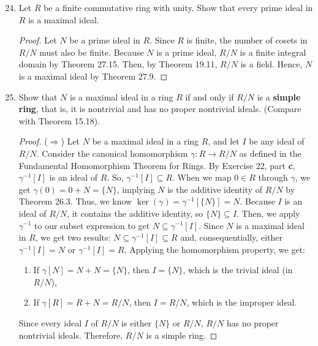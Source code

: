 \documentclass[12pt, oneside]{book}
\newcommand{\pf}[1]{
    \begin{customframedproof}[linecolor=orangehdx!75]
        \begin{proof}
        #1
        \end{proof}
    \end{customframedproof}
}
\begin{document}
\begin{enumerate}
	\setcounter{enumi}{23}
	\item Let \(R\) be a finite commutative ring with unity. Show that every prime ideal in \(R\) is a maximal ideal.
	\pf{
		Let \(N\) be a prime ideal in \(R\). Since \(R\) is finite, the number of cosets in \(R/N\) must also be finite. Because \(N\) is a prime ideal, \(R/N\) is a finite integral domain by Theorem 27.15. Then, by Theorem 19.11, \(R/N\) is a field. Hence, \(N\) is a maximal ideal by Theorem 27.9.  
	}

	\setcounter{enumi}{28}
	\item Show that \(N\) is a maximal ideal in a ring \(R\) if and only if \(R/N\) is a \textbf{simple ring}, that is, it is nontrivial and has no proper nontrivial ideals. (Compare with Theorem 15.18).
	\pf{
		(\(\Rightarrow\)) Let \(N\) be a maximal ideal in a ring \(R\), and let \(I\) be any ideal of \(R/N\). Consider the canonical homomorphism \(\gamma : R \to R/N\) as defined in the Fundamental Homomorphism Theorem for Rings. By Exercise 22, part \textbf{c}, \(\gamma^{-1}[I]\) is an ideal of \(R\). So, \(\gamma^{-1}[I] \subseteq R\). When we map \(0 \in R\) through \(\gamma\), we get \(\gamma(0) = 0 + N = \{N\}\), implying \(N\) is the additive identity of \(R/N\) by Theorem 26.3. Thus, we know \(\ker(\gamma) = \gamma^{-1}[\{N\}] = N\). Because \(I\) is an ideal of \(R/N\), it contains the additive identity, so \(\{N\} \subseteq I\). Then, we apply \(\gamma^{-1}\) to our subset expression to get \(N \subseteq \gamma^{-1}[I]\). 
		Since \(N\) is a maximal ideal in \(R\), we get two results: \(N \subseteq \gamma^{-1}[I] \subseteq R\) and, consequentially, either \(\gamma^{-1}[I] = N\) or \(\gamma^{-1}[I] = R\). Applying the homomorphism property, we get:
		\begin{enumerate}[label=(\arabic*)]
			\item If \(\gamma[N] = N + N = \{N\}\), then \(I = \{N\}\), which is the trivial ideal (in \(R/N\)),
			\item If \(\gamma[R] = R + N = R/N\), then \(I = R/N\), which is the improper ideal.
		\end{enumerate}
		Since every ideal \(I\) of \(R/N\) is either \(\{N\}\) or \(R/N\), \(R/N\) has no proper nontrivial ideals. Therefore, \(R/N\) is a simple ring.

}
\end{enumerate}
\end{document}

